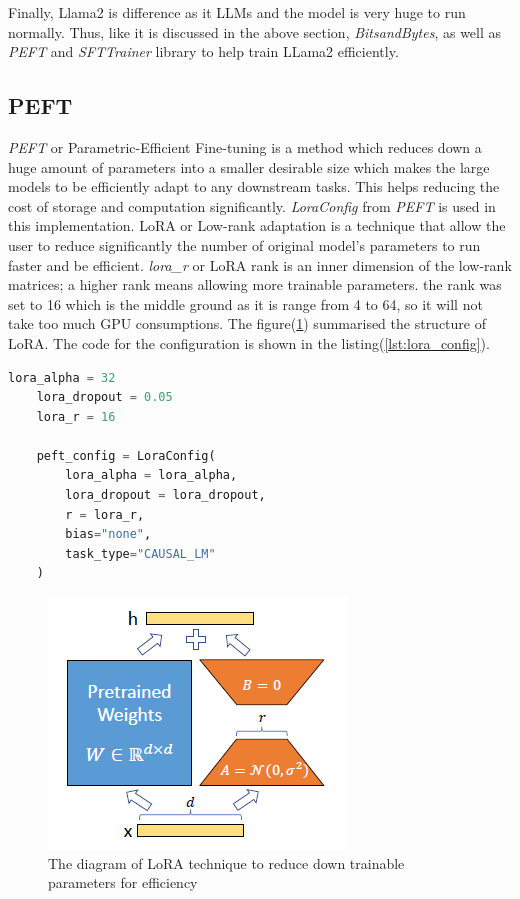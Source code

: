 Finally, Llama2 is difference as it LLMs and the model is very huge to run normally. Thus, like it is discussed in the above section, \textit{BitsandBytes}, as well as \textit{PEFT} and \textit{SFTTrainer}  library to help train LLama2 efficiently\cite{Huggingface_peft}. 

\subsection{PEFT}
\textit{PEFT} or Parametric-Efficient Fine-tuning is a method which reduces down a huge amount of parameters into a smaller desirable size which makes the large models to be efficiently adapt to any downstream tasks\cite{Huggingface_peft}. This helps reducing the cost of storage and computation significantly\cite{Huggingface_peft}. \textit{LoraConfig} from \textit{PEFT} is used in this implementation. LoRA or Low-rank adaptation is a technique that allow the user to reduce significantly the number of original model's parameters to run faster and be efficient\cite{HuggingFace_lora}. \textit{lora\_r} or LoRA rank is an inner dimension of the low-rank matrices; a higher rank means allowing more trainable parameters\cite{HuggingFace_lora}. the rank was set to 16 which is the middle ground as it is range from 4 to 64, so it will not take too much GPU consumptions\cite{HuggingFace_lora}. The figure(\ref{fig:Lora}) summarised the structure of LoRA. The code for the configuration is shown in the listing(\ref{lst:lora_config}).
\bigskip

\begin{lstlisting}[language=Python, caption=The code for LoRA configuration, label=lst:lora_config]
    lora_alpha = 32
    lora_dropout = 0.05
    lora_r = 16
    
    peft_config = LoraConfig(
        lora_alpha = lora_alpha,
        lora_dropout = lora_dropout,
        r = lora_r,
        bias="none",
        task_type="CAUSAL_LM"
    )
\end{lstlisting}

\begin{figure}[h!]
    \centerline{\includegraphics[scale=0.7]{Figures/Lora_brief.png}}
    \caption{The diagram of LoRA technique to reduce down trainable parameters for efficiency}
    \label{fig:Lora}
\end{figure}


